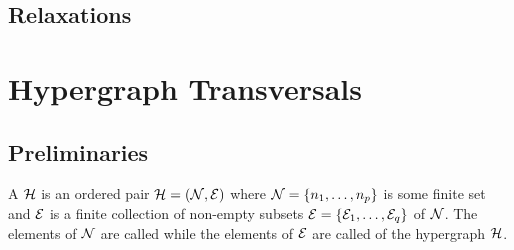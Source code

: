\documentclass[aps, 10pt, english, twoside, twocolumn, pra, nofootinbib, tightenlines, longbibliography, superscriptaddress]{revtex4-1}
\begin{document}
    \subsection{Relaxations}

    \section{Hypergraph Transversals}
    \subsection{Preliminaries}
    \cite{Kavvadias_2005}
    \cite{Boros_2004}
    \cite{Boros_2002}
    \begin{definition}
        \label{def:hypergraph}
        A  $\mathcal{H}$ is an ordered pair $\hypergraph = \br{\nodes, \edges}$ where $\nodes = \bc{n_1, \ldots, n_p}$ is some finite set and $\mathcal{E}$ is a finite collection of non-empty subsets $\edges = \bc{\edges_{1}, \ldots, \edges_{q}}$ of $\mathcal{N}$. The elements of $\mathcal{N}$ are called  while the elements of $\mathcal{E}$ are called  of the hypergraph $\mathcal{H}$.
    \end{definition}
\end{document}
